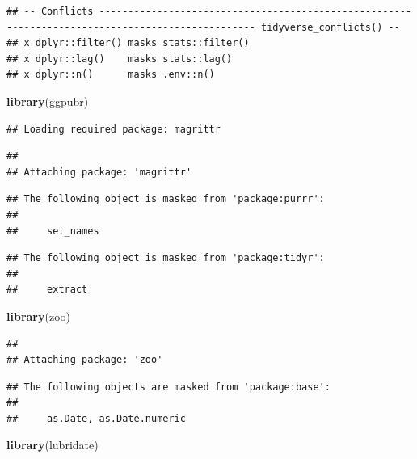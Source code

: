 \documentclass[10pt,A4,]{article}
\newenvironment{Shaded}{\begin{snugshade}}{\end{snugshade}}
\newcommand{\KeywordTok}[1]{\textcolor[rgb]{0.13,0.29,0.53}{\textbf{#1}}}
\newcommand{\NormalTok}[1]{#1}
\begin{document}
\begin{verbatim}
## -- Conflicts ------------------------------------------------------------------------------------------------- tidyverse_conflicts() --
## x dplyr::filter() masks stats::filter()
## x dplyr::lag()    masks stats::lag()
## x dplyr::n()      masks .env::n()
\end{verbatim}

\begin{Shaded}
\begin{Highlighting}[]
\KeywordTok{library}\NormalTok{(ggpubr)}
\end{Highlighting}
\end{Shaded}

\begin{verbatim}
## Loading required package: magrittr
\end{verbatim}

\begin{verbatim}
## 
## Attaching package: 'magrittr'
\end{verbatim}

\begin{verbatim}
## The following object is masked from 'package:purrr':
## 
##     set_names
\end{verbatim}

\begin{verbatim}
## The following object is masked from 'package:tidyr':
## 
##     extract
\end{verbatim}

\begin{Shaded}
\begin{Highlighting}[]
\KeywordTok{library}\NormalTok{(zoo)}
\end{Highlighting}
\end{Shaded}

\begin{verbatim}
## 
## Attaching package: 'zoo'
\end{verbatim}

\begin{verbatim}
## The following objects are masked from 'package:base':
## 
##     as.Date, as.Date.numeric
\end{verbatim}

\begin{Shaded}
\begin{Highlighting}[]
\KeywordTok{library}\NormalTok{(lubridate)}
\end{Highlighting}
\end{Shaded}
\end{document}
